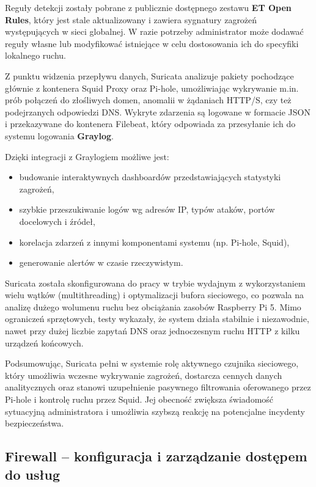 \documentclass[
    left=2.5cm,         %
    right=2.5cm,        %
    top=2.5cm,          %
    bottom=3cm,         %
    bindingoffset=6mm,  %
    nohyphenation=true %
]{eiti/eiti-thesis} %
\begin{document}
Reguły detekcji zostały pobrane z publicznie dostępnego zestawu \textbf{ET Open Rules}, który jest stale aktualizowany i zawiera sygnatury zagrożeń występujących w sieci globalnej. W razie potrzeby administrator może dodawać reguły własne lub modyfikować istniejące w celu dostosowania ich do specyfiki lokalnego ruchu.

Z punktu widzenia przepływu danych, Suricata analizuje pakiety pochodzące głównie z kontenera Squid Proxy oraz Pi-hole, umożliwiając wykrywanie m.in. prób połączeń do złośliwych domen, anomalii w żądaniach HTTP/S, czy też podejrzanych odpowiedzi DNS. Wykryte zdarzenia są logowane w formacie JSON i przekazywane do kontenera Filebeat, który odpowiada za przesyłanie ich do systemu logowania \textbf{Graylog}.

Dzięki integracji z Graylogiem możliwe jest:
\begin{itemize}
    \item budowanie interaktywnych dashboardów przedstawiających statystyki zagrożeń,
    \item szybkie przeszukiwanie logów wg adresów IP, typów ataków, portów docelowych i źródeł,
    \item korelacja zdarzeń z innymi komponentami systemu (np. Pi-hole, Squid),
    \item generowanie alertów w czasie rzeczywistym.
\end{itemize}

Suricata została skonfigurowana do pracy w trybie wydajnym z wykorzystaniem wielu wątków (multithreading) i optymalizacji bufora sieciowego, co pozwala na analizę dużego wolumenu ruchu bez obciążania zasobów Raspberry Pi 5. Mimo ograniczeń sprzętowych, testy wykazały, że system działa stabilnie i niezawodnie, nawet przy dużej liczbie zapytań DNS oraz jednoczesnym ruchu HTTP z kilku urządzeń końcowych.

Podsumowując, Suricata pełni w systemie rolę aktywnego czujnika sieciowego, który umożliwia wczesne wykrywanie zagrożeń, dostarcza cennych danych analitycznych oraz stanowi uzupełnienie pasywnego filtrowania oferowanego przez Pi-hole i kontrolę ruchu przez Squid. Jej obecność zwiększa świadomość sytuacyjną administratora i umożliwia szybszą reakcję na potencjalne incydenty bezpieczeństwa.

\subsection{Firewall – konfiguracja i zarządzanie dostępem do usług}
\end{document}
